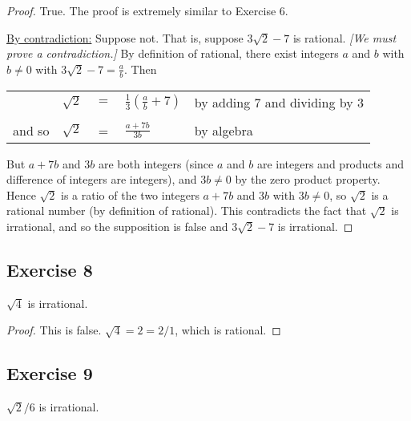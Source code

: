 \documentclass[14pt]{extarticle}
\newcommand{\dps}{\displaystyle}
\newcommand{\cy}{\color{cyan}}
\begin{document}
\begin{proof}
    True. The proof is extremely similar to Exercise 6.

    \underline{By contradiction:} Suppose not. That is, suppose
    $3\sqrt{2} - 7$ is rational. {\it [We must prove a contradiction.]} By definition of rational, there exist integers $a$ and $b$ with $b \neq 0$ with $3\sqrt{2} - 7 = \frac{a}{b}$. Then

    \begin{center}
        \begin{tabular}{lrcll}
                   & $\sqrt{2}$ & $=$ & $\dps\frac{1}{3}\left(\frac{a}{b} + 7\right) $ & {\cy by adding 7 and dividing by 3} \\
            \\
            and so & $\sqrt{2}$ & =   & $\dps\frac{a+7b}{3b}$                          & {\cy by algebra}                    \\
        \end{tabular}
    \end{center}

    But $a + 7b$ and $3b$ are both integers (since $a$ and $b$ are integers and products and difference of integers are integers), and $3b \neq 0$ by the zero product property. Hence $\sqrt{2}$ is a ratio of the two integers $a + 7b$ and $3b$ with $3b \neq 0$, so $\sqrt{2}$ is a rational number (by definition of rational). This contradicts the fact that $\sqrt{2}$ is irrational, and so the supposition is false and $3\sqrt{2} - 7$ is irrational.
\end{proof}

\subsection{Exercise 8}
$\sqrt{4}$ is irrational.

\begin{proof}
    This is false. $\sqrt{4} = 2 = 2/1$, which is rational.
\end{proof}

\subsection{Exercise 9}
$\sqrt{2}/6$ is irrational.
\end{document}
